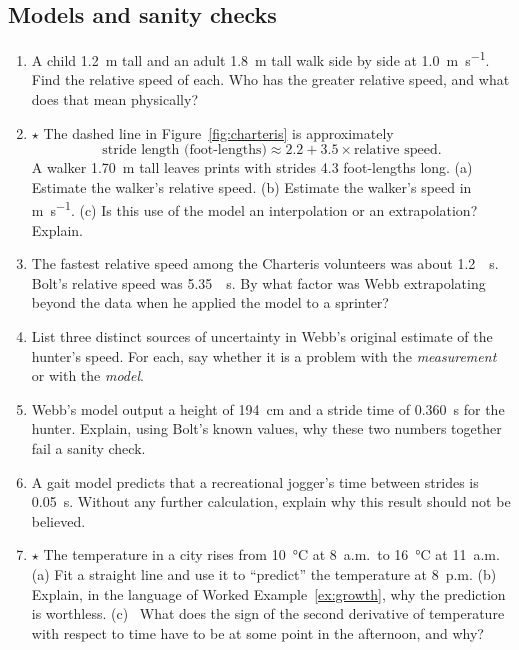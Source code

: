 \documentclass[11pt,twoside,openany]{book}
\newcounter{check}[chapter]
\newcommand{\viewtag}[3]{\fcolorbox{#2}{#3}{\footnotesize\textbf{\textcolor{#2}{#1}}}}
\newcommand{\calctag}{\viewtag{Calculus}{calccol}{calcpale}}
\begin{document}
\subsection*{Models and sanity checks}
\begin{enumerate}[label=\textbf{\thechapter.\arabic*},resume=exercises,leftmargin=*]
  \item A child \SI{1.2}{\metre} tall and an adult \SI{1.8}{\metre} tall walk side by side at \SI{1.0}{\metre\per\second}. Find the relative speed of each. Who has the greater relative speed, and what does that mean physically?
  \item $\star$ The dashed line in Figure~\ref{fig:charteris} is approximately
  \[
  \text{stride length (foot-lengths)} \approx 2.2 + 3.5\times\text{relative speed}.
  \]
  A walker \SI{1.70}{\metre} tall leaves prints with strides \num{4.3} foot-lengths long. (a) Estimate the walker's relative speed. (b) Estimate the walker's speed in \si{\metre\per\second}. (c) Is this use of the model an interpolation or an extrapolation? Explain.
  \item The fastest relative speed among the Charteris volunteers was about \SI{1.2}{\per\second}. Bolt's relative speed was \SI{5.35}{\per\second}. By what factor was Webb extrapolating beyond the data when he applied the model to a sprinter?
  \item List three distinct sources of uncertainty in Webb's original estimate of the hunter's speed. For each, say whether it is a problem with the \emph{measurement} or with the \emph{model}.
  \item Webb's model output a height of \SI{194}{\centi\metre} and a stride time of \SI{0.360}{\second} for the hunter. Explain, using Bolt's known values, why these two numbers together fail a sanity check.
  \item A gait model predicts that a recreational jogger's time between strides is \SI{0.05}{\second}. Without any further calculation, explain why this result should not be believed.
  \item $\star$ The temperature in a city rises from \SI{10}{\celsius} at 8~a.m.\ to \SI{16}{\celsius} at 11~a.m. (a) Fit a straight line and use it to ``predict'' the temperature at 8~p.m. (b) Explain, in the language of Worked Example~\ref{ex:growth}, why the prediction is worthless. (c) \calctag\ What does the sign of the second derivative of temperature with respect to time have to be at some point in the afternoon, and why?
\end{enumerate}
\end{document}
